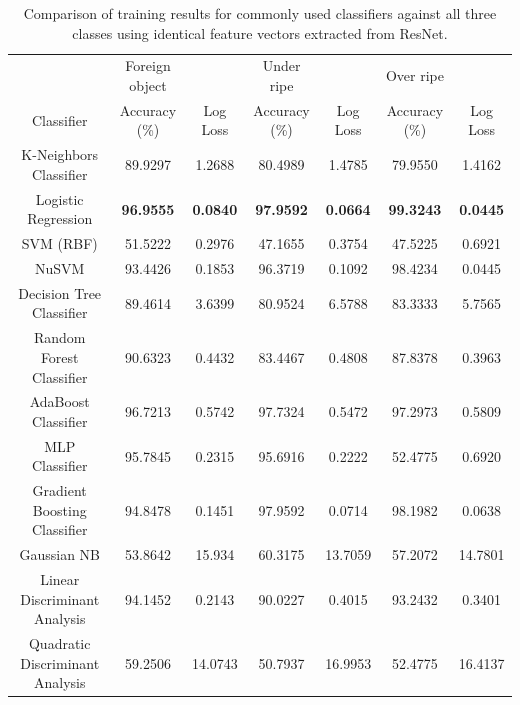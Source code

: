 \documentclass[fleqn,twoside,12pt]{report}
\begin{document}
\begin{table}
	\centering
	\caption{Comparison of training results for commonly used classifiers against all three classes using identical feature vectors extracted from ResNet.}
	\label{tab:classifiers}
	\begin{tabular}{ccccccc}
		\toprule
		& Foreign object &          & Under ripe    &          & Over ripe     &           \\  
		Classifier & Accuracy (\%)  & Log Loss & Accuracy (\%) & Log Loss & Accuracy (\%) & Log Loss  \\ 
		\midrule
		K-Neighbors Classifier          & 89.9297  & 1.2688 & 80.4989 & 1.4785 & 79.9550 & 1.4162 \\[6pt] 
		Logistic Regression	            & \textbf{96.9555}  & \textbf{0.0840} & \textbf{97.9592} & \textbf{0.0664} &  \textbf{99.3243} & \textbf{0.0445} \\[6pt]
		SVM (RBF)	                    & 51.5222  & 0.2976 & 47.1655 & 0.3754 & 47.5225 & 0.6921 \\[6pt]
		NuSVM	                        & 93.4426  & 0.1853 & 96.3719 & 0.1092 & 98.4234 & 0.0445 \\[6pt]
		Decision Tree Classifier	    & 89.4614  & 3.6399 & 80.9524 & 6.5788 & 83.3333 & 5.7565 \\[6pt]
		Random Forest Classifier	    & 90.6323  & 0.4432 & 83.4467 & 0.4808 & 87.8378 & 0.3963 \\[6pt]
		AdaBoost Classifier	            & 96.7213  & 0.5742 & 97.7324 & 0.5472 & 97.2973 & 0.5809 \\[6pt]
		MLP Classifier	                & 95.7845  & 0.2315 & 95.6916 & 0.2222 & 52.4775 & 0.6920 \\[6pt]
		Gradient Boosting Classifier	& 94.8478  & 0.1451 & 97.9592 & 0.0714 & 98.1982 & 0.0638 \\[6pt]
		Gaussian NB	                    & 53.8642  & 15.934 & 60.3175 & 13.7059 & 57.2072 & 14.7801 \\[6pt]
		Linear Discriminant Analysis	& 94.1452  & 0.2143 & 90.0227 & 0.4015 & 93.2432 & 0.3401 \\[6pt]
		Quadratic Discriminant Analysis	& 59.2506  & 14.0743 & 50.7937 & 16.9953 & 52.4775 & 16.4137 \\[6pt]
		\bottomrule 
	\end{tabular}
\end{table}
\end{document}
